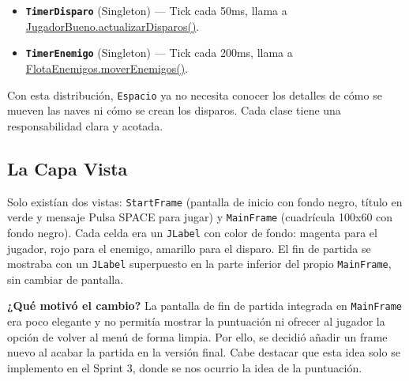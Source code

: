 \documentclass[12pt, a4paper]{article}
\begin{document}
\begin{cajafinal}
\begin{itemize}
    \item \textbf{\texttt{TimerDisparo}} (Singleton) --- Tick cada 50ms, llama a \url{JugadorBueno.actualizarDisparos()}.
    \item \textbf{\texttt{TimerEnemigo}} (Singleton) --- Tick cada 200ms, llama a \url{FlotaEnemigos.moverEnemigos()}.
\end{itemize}
 
Con esta distribuci\'{o}n, \texttt{Espacio} ya no necesita conocer los detalles de c\'{o}mo se mueven las naves ni c\'{o}mo se crean los disparos. Cada clase tiene una responsabilidad clara y acotada.
\end{cajafinal}
 
\subsection{La Capa Vista}
 
\begin{cajasprint1}
Solo exist\'{i}an dos vistas: \texttt{StartFrame} (pantalla de inicio con fondo negro, t\'{i}tulo en verde y mensaje \guillemotleft Pulsa SPACE para jugar\guillemotright) y \texttt{MainFrame} (cuadr\'{i}cula 100x60 con fondo negro). Cada celda era un \texttt{JLabel} con color de fondo: magenta para el jugador, rojo para el enemigo, amarillo para el disparo. El fin de partida se mostraba con un \texttt{JLabel} superpuesto en la parte inferior del propio \texttt{MainFrame}, sin cambiar de pantalla.
\end{cajasprint1}
 
\vspace{0.5em}
\textbf{¿Qu\'{e} motiv\'{o} el cambio?} La pantalla de fin de partida integrada en \texttt{MainFrame} era poco elegante y no permit\'{i}a mostrar la puntuaci\'{o}n ni ofrecer al jugador la opci\'{o}n de volver al men\'{u} de forma limpia. Por ello, se decidi\'{o} a\~{n}adir un frame nuevo al acabar la partida en la versi\'{o}n final. Cabe destacar que esta idea solo se implemento en el Sprint 3, donde se nos ocurrio la idea de la puntuación.
 
\vspace{0.5em}
 
\end{document}
